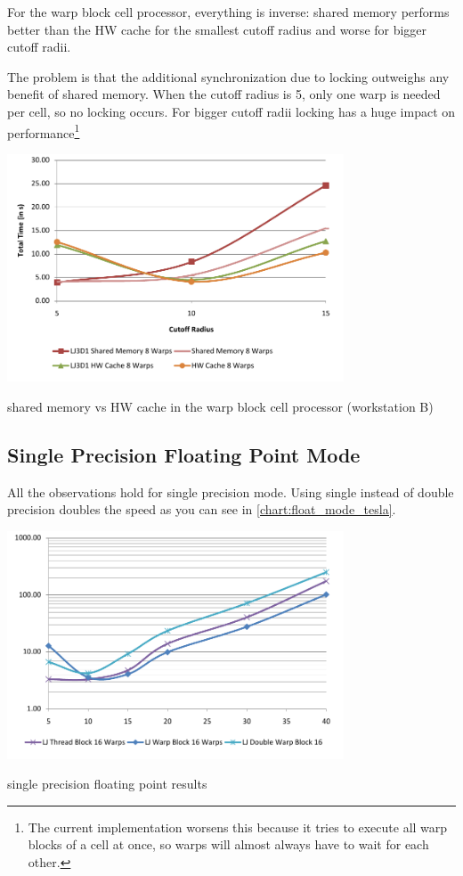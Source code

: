 For the warp block cell processor, everything is inverse: shared memory performs better than the HW cache for the smallest cutoff radius and worse for bigger cutoff radii.

The problem is that the additional synchronization due to locking outweighs any benefit of shared memory. When the cutoff radius is 5, only one warp is needed per cell, so no locking occurs. For bigger cutoff radii locking has a huge impact on performance\footnote{The current implementation worsens this because it tries to execute all warp blocks of a cell at once, so warps will almost always have to wait for each other.}

\begin{chart}
\centering
\includegraphics[width=0.75\textwidth]{plots/wbcp_mode_comp_tesla.pdf}
\caption{shared memory vs HW cache in the warp block cell processor (workstation B)}
\label{chart:wbcp_mode_comp_tesla}
\end{chart}

\subsection{Single Precision Floating Point Mode}
All the observations hold for single precision mode. Using single instead of double precision doubles the speed as you can see in \autoref{chart:float_mode_tesla}.

\begin{chart}
\centering
\includegraphics[width=0.75\textwidth]{plots/float_mode_tesla.pdf}
\caption{single precision floating point results}
\label{chart:float_mode_tesla}
\end{chart}

